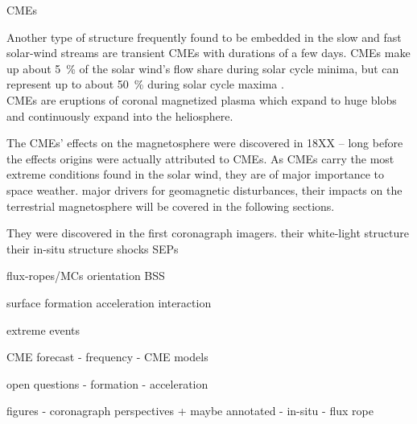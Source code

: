
CMEs

Another type of structure frequently found to be embedded in the slow and fast solar-wind streams are transient CMEs with durations of a few days. CMEs make up about \SI{5}{\percent} of the solar wind's flow share during solar cycle minima, but can represent up to about \SI{50}{\percent} during solar cycle maxima \citep{Richardson2012}.\\


CMEs are eruptions of coronal magnetized plasma which expand to huge blobs and continuously expand into the heliosphere.

The CMEs' effects on the magnetosphere were discovered in 18XX -- long before the effects origins were actually attributed to CMEs.
As CMEs carry the most extreme conditions found in the solar wind, they are of major importance to space weather.
major drivers for geomagnetic disturbances, their impacts on the terrestrial magnetosphere will be covered in the following sections.


They were discovered in the first coronagraph imagers.
their white-light structure
their in-situ structure
shocks
SEPs

flux-ropes/MCs
orientation
BSS



surface formation
acceleration
interaction



extreme events

CME forecast
- frequency
- CME models

open questions
- formation
- acceleration


figures
- coronagraph perspectives + maybe annotated
- in-situ
- flux rope

